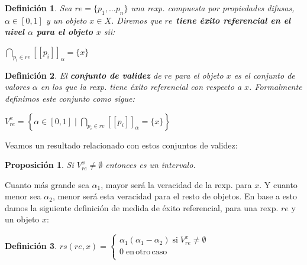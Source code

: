 \documentclass{beamer}
\newtheorem{definicion}{Definición}
\newtheorem{proposicion}{Proposición}
\begin{document}
	\begin{frame}
		\begin{definicion}
			Sea $re = \lbrace p_1,...p_n\rbrace$ una rexp. compuesta por propiedades difusas, $\alpha \in [0,1]$ y un objeto $x \in X$. Diremos que \textbf{$re$ tiene éxito referencial en el nivel $\alpha$ para el objeto $x$} sii:

			\begin{center}
				$\underset{p_i \in re}{\bigcap}[[p_i]]_\alpha = \lbrace x \rbrace$
			\end{center}
		\end{definicion}
	\end{frame}
	
	\begin{frame}
		\begin{definicion}
			El \textbf{conjunto de validez} de $re$ para el objeto $x$ es el conjunto de valores $\alpha$ en los que la rexp. tiene éxito referencial con respecto a $x$. Formalmente definimos este conjunto como sigue:
			\begin{center}
				$V_{re}^x = \left\lbrace \alpha \in [0,1] \mid \underset{p_i \in re}{\bigcap}[[p_i]]_\alpha = \lbrace x \rbrace \right\rbrace$
			\end{center}
		\end{definicion}

		Veamos un resultado relacionado con estos conjuntos de validez:

		\begin{proposicion}
			Si $V_{re}^x \neq \emptyset$ entonces es un intervalo.
		\end{proposicion}
	\end{frame}
	
	\begin{frame}
		Cuanto más grande sea $\alpha_1$, mayor será la veracidad de la rexp. para $x$. Y cuanto menor sea $\alpha_2$, menor será esta veracidad para el resto de objetos. En base a esto damos la siguiente definición de medida de éxito referencial, para una rexp. $re$ y un objeto $x$:

		\begin{definicion}
		\label{def: medida}
			$rs(re, x) = \left\lbrace 
			\begin{array}{ll}
      			\alpha_1(\alpha_1 - \alpha_2) \; \mathrm{si} \; V_{re}^x \neq \emptyset\\      
      			0 \; \mathrm{en \, otro \, caso}\\
			\end{array} \right.$
		\end{definicion}
	\end{frame}
	
\end{document}
